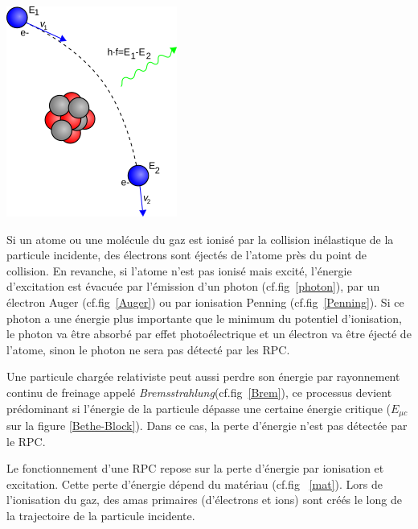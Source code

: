\marginpar
{
	\centering
	\includegraphics[width=\marginparwidth]{RPC/Brem.png}
	\label{Brem}
}

Si un atome ou une molécule du gaz est ionisé par la collision inélastique de la particule incidente, des électrons sont éjectés de l'atome près du point de collision. En revanche, si l'atome n'est pas ionisé mais excité, l'énergie d'excitation est évacuée par l'émission d'un photon (cf.fig~\ref{photon}), par un électron Auger (cf.fig~\ref{Auger}) ou par ionisation Penning (cf.fig~\ref{Penning}). Si ce photon a une énergie plus importante que le minimum du potentiel d'ionisation, le photon va être absorbé par effet photoélectrique et un électron va être éjecté de l'atome, sinon le photon ne sera pas détecté par les RPC.

Une particule chargée relativiste peut aussi perdre son énergie par rayonnement continu de freinage appelé \textit{Bremsstrahlung}(cf.fig~\ref{Brem}), ce processus devient prédominant si l'énergie de la particule dépasse une certaine énergie critique ($E_{\mu c}$ sur la figure \ref{Bethe-Block}). Dans ce cas, la perte d'énergie n'est pas détectée par le RPC.

Le fonctionnement d'une RPC repose sur la perte d'énergie par ionisation et excitation. Cette perte d'énergie dépend du matériau (cf.fig~ \ref{mat}). Lors de l'ionisation du gaz, des amas primaires (d'électrons et ions) sont créés le long de la trajectoire de la particule incidente. 


